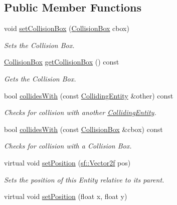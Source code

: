 \subsection*{Public Member Functions}
\begin{DoxyCompactItemize}
\item 
void \mbox{\hyperlink{class_colliding_entity_a374b018899b679791c3154d29457a9c5}{set\+Collision\+Box}} (\mbox{\hyperlink{class_collision_box}{Collision\+Box}} cbox)
\begin{DoxyCompactList}\small\item\em Sets the Collision Box. \end{DoxyCompactList}\item 
\mbox{\hyperlink{class_collision_box}{Collision\+Box}} \mbox{\hyperlink{class_colliding_entity_ac47d631afb3401467c99b87ee42d895a}{get\+Collision\+Box}} () const
\begin{DoxyCompactList}\small\item\em Gets the Collision Box. \end{DoxyCompactList}\item 
bool \mbox{\hyperlink{class_colliding_entity_abb29e39718af974740d80e4a03251c8d}{collides\+With}} (const \mbox{\hyperlink{class_colliding_entity}{Colliding\+Entity}} \&other) const
\begin{DoxyCompactList}\small\item\em Checks for collision with another \mbox{\hyperlink{class_colliding_entity}{Colliding\+Entity}}. \end{DoxyCompactList}\item 
bool \mbox{\hyperlink{class_colliding_entity_a36300f55f5bc4dfcb949929449b1151b}{collides\+With}} (const \mbox{\hyperlink{class_collision_box}{Collision\+Box}} \&cbox) const
\begin{DoxyCompactList}\small\item\em Checks for collision with a Collision Box. \end{DoxyCompactList}\item 
virtual void \mbox{\hyperlink{class_colliding_entity_a9fe117b77d6df746538d25ca501ea47a}{set\+Position}} (\mbox{\hyperlink{classsf_1_1_vector2}{sf\+::\+Vector2f}} pos)
\begin{DoxyCompactList}\small\item\em Sets the position of this Entity relative to its parent. \end{DoxyCompactList}\item 
virtual void \mbox{\hyperlink{class_colliding_entity_a19c8004842f6252300a4e74add66e4e6}{set\+Position}} (float x, float y)

\end{DoxyCompactItemize}

